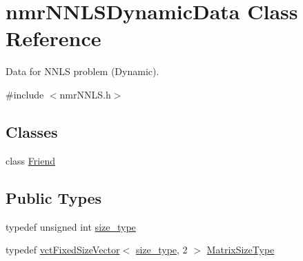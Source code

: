 \hypertarget{classnmr_n_n_l_s_dynamic_data}{}\section{nmr\+N\+N\+L\+S\+Dynamic\+Data Class Reference}
\label{classnmr_n_n_l_s_dynamic_data}


Data for N\+N\+L\+S problem (Dynamic).  




{\ttfamily \#include $<$nmr\+N\+N\+L\+S.\+h$>$}

\subsection*{Classes}
\begin{DoxyCompactItemize}
\item 
class \hyperlink{classnmr_n_n_l_s_dynamic_data_1_1_friend}{Friend}
\end{DoxyCompactItemize}
\subsection*{Public Types}
\begin{DoxyCompactItemize}
\item 
typedef unsigned int \hyperlink{classnmr_n_n_l_s_dynamic_data_aff3aaadfea66b14eac2e3e022e41b35b}{size\+\_\+type}
\item 
typedef \hyperlink{classvct_fixed_size_vector}{vct\+Fixed\+Size\+Vector}$<$ \hyperlink{classnmr_n_n_l_s_dynamic_data_aff3aaadfea66b14eac2e3e022e41b35b}{size\+\_\+type}, 2 $>$ \hyperlink{classnmr_n_n_l_s_dynamic_data_ab99da17071a513448294ee9a420eb4e0}{Matrix\+Size\+Type}
\end{DoxyCompactItemize}
